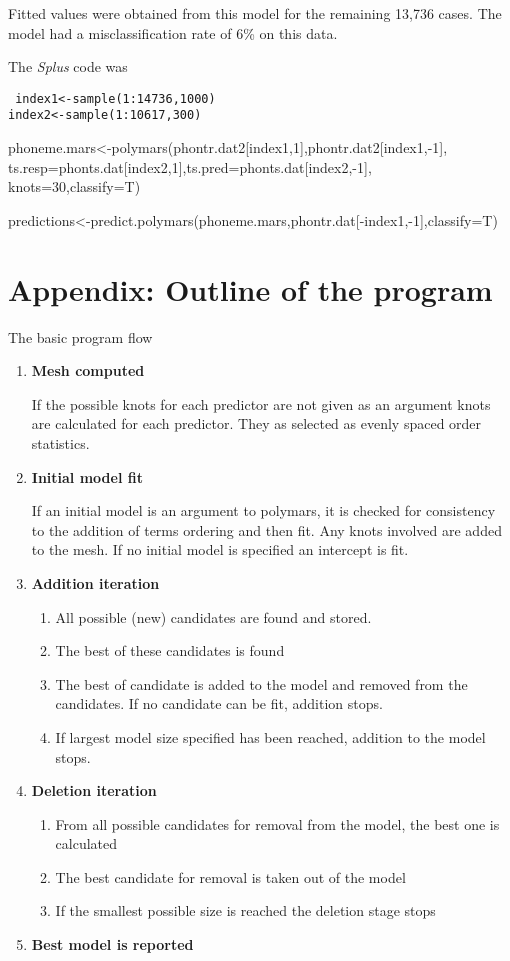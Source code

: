 \noindent
Fitted values were obtained from this model for the remaining 13,736
cases. The model had a misclassification rate of 6\% on this data.

\noindent
The {\em Splus} code was\\
{\tt 
index1<-sample(1:14736,1000)\\
index2<-sample(1:10617,300)

\noindent
phoneme.mars<-polymars(phontr.dat2[index1,1],phontr.dat2[index1,-1],\\
ts.resp=phonts.dat[index2,1],ts.pred=phonts.dat[index2,-1],\\
knots=30,classify=T)

\noindent
predictions<-predict.polymars(phoneme.mars,phontr.dat[-index1,-1],classify=T)

}

\section*{Appendix:
Outline of the program}
The basic program flow 
\begin{enumerate}
\item {\bf Mesh computed}

If the possible knots for each predictor are not given as an argument
knots are calculated for each predictor. They as selected as evenly
spaced order statistics.

\item{\bf Initial model fit}

If an initial model is an argument to polymars, it is checked for
consistency to the addition of terms ordering and then fit. Any knots
involved are added to the mesh.
If no initial model is specified an intercept is fit.

\item{\bf Addition iteration}
\begin{enumerate}
\item{All possible (new) candidates are found and stored.}

\item{The best of these candidates is found}

\item{The best of candidate is added to the model and removed
from the candidates. If no candidate can be fit, addition
stops.}

\item{If largest model size specified has been reached, addition to the
model stops.}
\end{enumerate}

\item{\bf Deletion iteration}
\begin{enumerate}
\item{From all possible candidates for removal from the model, the
best one is calculated}
\item{The best candidate for removal is taken out of the model}
\item{If the smallest possible size is reached the deletion stage stops}
\end{enumerate}
\item{\bf Best model is reported} 
\end{enumerate}

